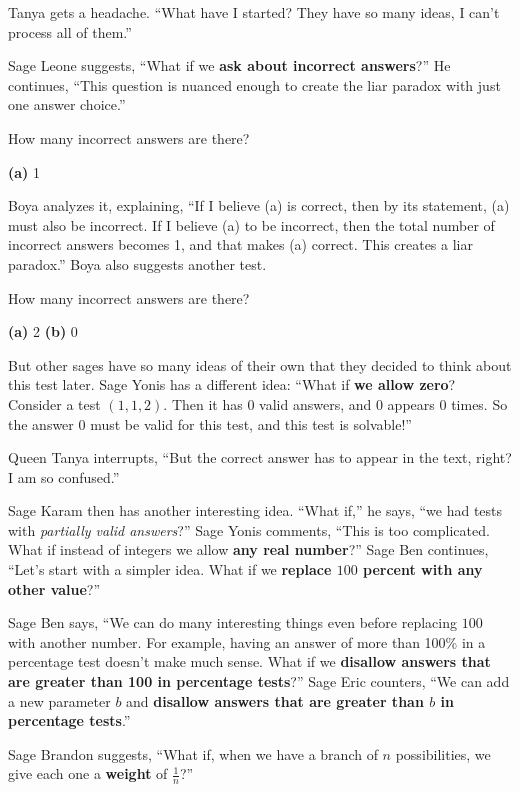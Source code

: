 \documentclass[12pt,reqno]{article}
\theoremstyle{plain}
\theoremstyle{definition}
\theoremstyle{remark}
\begin{document}
Tanya gets a headache. ``What have I started? They have so many ideas, I can't process all of them.''

Sage Leone suggests, ``What if we \textbf{ask about incorrect answers}?'' He continues, ``This question is nuanced enough to create the liar paradox with just one answer choice.''

\begin{center}
How many incorrect answers are there?

\textbf{(a)} 1
\end{center}

Boya analyzes it, explaining, ``If I believe (a) is correct, then by its statement, (a) must also be incorrect. If I believe (a) to be incorrect, then the total number of incorrect answers becomes 1, and that makes (a) correct. This creates a liar paradox.'' Boya also suggests another test.

\begin{center}
How many incorrect answers are there?

\textbf{(a)} 2 \quad \textbf{(b)} 0
\end{center}

But other sages have so many ideas of their own that they decided to think about this test later. Sage Yonis has a different idea: ``What if \textbf{we allow zero}? Consider a test $(1,1,2)$. Then it has $0$ valid answers, and $0$ appears $0$ times. So the answer $0$ must be valid for this test, and this test is solvable!''

Queen Tanya interrupts, ``But the correct answer has to appear in the text, right? I am so confused.''

Sage Karam then has another interesting idea. ``What if,'' he says, ``we had tests with \textit{partially valid answers}?'' Sage Yonis comments, ``This is too complicated. What if instead of integers we allow \textbf{any real number}?'' Sage Ben continues, ``Let's start with a simpler idea. What if we \textbf{replace $100$ percent with any other value}?''

Sage Ben says, ``We can do many interesting things even before replacing $100$ with another number. For example, having an answer of more than 100\% in a percentage test doesn't make much sense. What if we \textbf{disallow answers that are greater than 100 in percentage tests}?'' Sage Eric counters, ``We can add a new parameter $b$ and \textbf{disallow answers that are greater than $b$ in percentage tests}.''

Sage Brandon suggests, ``What if, when we have a branch of $n$ possibilities, we give each one a \textbf{weight} of $\frac{1}{n}$?''
\end{document}
